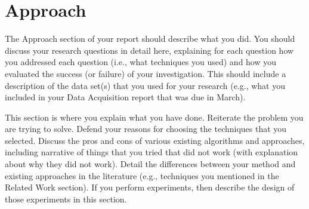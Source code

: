 \section{Approach} 

The Approach section of your report should describe what you did. You should discuss your research questions in detail here, explaining for each question how you addressed each question (i.e., what techniques you used) and how you evaluated the success (or failure) of your investigation. This should include a description of the data set(s) that you used for your research (e.g., what you included in your Data Acquisition report that was due in March).

This section is where you explain what you have done. Reiterate the problem you are trying to solve. Defend your reasons for choosing the techniques that you selected. Discuss the pros and cons of various existing algorithms and approaches, including narrative of things that you tried that did not work (with explanation about why they did not work). Detail the differences between your method and existing approaches in the literature (e.g., techniques you mentioned in the Related Work section). If you perform experiments, then describe the design of those experiments in this section.
